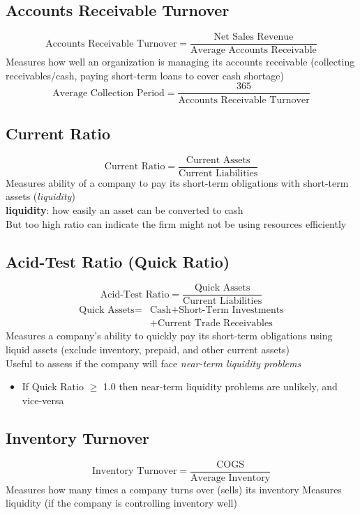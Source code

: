 \documentclass{article}
\begin{document}
\begin{multicols}{2}
\subsection{Accounts Receivable Turnover}
$$\text{Accounts Receivable Turnover} = \frac{\text{Net Sales Revenue}}{\text{Average Accounts Receivable}}$$
Measures how well an organization is managing its accounts receivable (collecting receivables/cash, paying short-term loans to cover cash shortage)
$$\text{Average Collection Period} = \frac{365}{\text{Accounts Receivable Turnover}}$$

\subsection{Current Ratio}
$$\text{Current Ratio} = \frac{\text{Current Assets}}{\text{Current Liabilities}}$$
Measures ability of a company to pay its short-term obligations with short-term assets (\textit{liquidity})\\
\textbf{liquidity}: how easily an asset can be converted to cash\\
But too high ratio can indicate the firm might not be using resources efficiently

\subsection{Acid-Test Ratio (Quick Ratio)}
$$\text{Acid-Test Ratio} = \frac{\text{Quick Assets}}{\text{Current Liabilities}}$$
\begin{equation*}
\begin{aligned}
\text{Quick Assets} = &\text{Cash} + \text{Short-Term Investments}\\
 &+ \text{Current Trade Receivables}
\end{aligned}
\end{equation*}
Measures a company's ability to quickly pay its short-term obligations using liquid assets (exclude inventory, prepaid, and other current assets)\\
Useful to assess if the company will face \textit{near-term liquidity problems}
\begin{itemize}
	\item If Quick Ratio $\geq$ 1.0 then near-term liquidity problems are unlikely, and vice-versa
\end{itemize}

\subsection{Inventory Turnover}
$$\text{Inventory Turnover} = \frac{\text{COGS}}{\text{Average Inventory}}$$
Measures how many times a company turns over (sells) its inventory
Measures liquidity (if the company is controlling inventory well)


\end{multicols}
\end{document}
